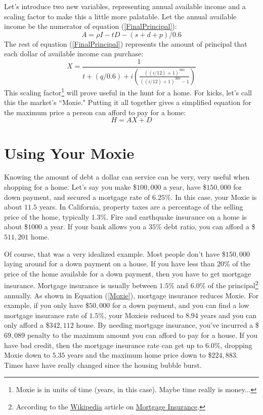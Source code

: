 \documentclass{article}
\begin{document}
Let's introduce two new variables, representing annual available income
 and a scaling factor to make this a little more palatable. Let the 
annual available income be the numerator of equation (\ref{FinalPrincipal}):
\begin{equation}
\label{AvailableIncome}
A = \rho I - tD - (s + d + p) / 0.6
\end{equation}
The rest of equation (\ref{FinalPrincipal}) represents the amount of
 principal that each dollar of available income can purchase: 
\begin{equation}
\label{Moxie}
X = \frac{1}{t + (q/0.6) +
i \left( \frac{((i/12) + 1)^{360}}{((i/12) + 1)^{360} - 1} \right)}
\end{equation}
This scaling factor\footnote{ 
Moxie is in units of time (years, in this case). Maybe time really is
 money...}
will prove useful in the hunt for a home. For kicks, let's call this
 the market's ``Moxie." Putting it all together gives a simplified
 equation for the maximum price a person can afford to pay for a home:
\begin{equation}
\label{SimplifiedHomePrice}
H = AX + D
\end{equation}

\pagebreak


\section{Using Your Moxie}

Knowing the amount of debt a dollar can service can be very, 
very useful when 
shopping for a home.  Let's say you make \$$100,000$ a year, have
 \$$150,000$ for down payment, and secured a mortgage rate of 
$6.25$\%.  In this case, your Moxie is about $11.5$ years. 
In California, property taxes are a percentage of the
 selling price of the home, typically $1.3$\%.  Fire and earthquake
 insurance on a home is about \$$1000$ a year. If your bank allows 
you a $35$\% debt ratio, you can afford a \$$511,201$ home.

Of course, that was a very idealized example. Most people don't have 
\$$150,000$ laying around for a down payment on a house. If you have
less than $20$\% of the price of the home available for a down payment,
then you have to get mortgage insurance. Mortgage 
insurance is usually
between $1.5$\% and $6.0$\% of the 
principal\footnote{According to the 
\href{http://en.wikipedia.org/wiki/Main_Page}{Wikipedia}
article on 
\href{http://en.wikipedia.org/wiki/Mortgage_insurance}{Mortgage Insurance}.} 
 annually. As shown in Equation (\ref{Moxie}), mortgage insurance 
reduces Moxie. For example, if you only have \$$50,000$ for a down
payment, and you can find a low mortgage insurance rate of $1.5$\%,
your Moxieis reduced to $8.94$ years and you can only 
afford a \$$342,112$ house.
By needing mortgage insurance, you've incurred a \$$69,089$ penalty
to the maximum amount you can afford to pay for a house. 
If you have bad credit, then the mortgage
insurance rate can get up to $6.0$\%, dropping Moxie down to $5.35$
years and the maximum home price down to \$$224,883$. Times have
have really changed since the housing bubble burst.
\end{document}
